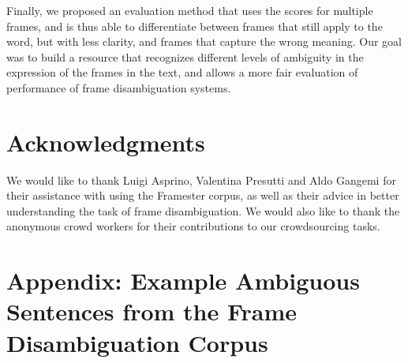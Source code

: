 Finally, we proposed an evaluation method that uses the scores for multiple frames, and is thus able to differentiate between frames that still apply to the word, but with less clarity, and frames that capture the wrong meaning. Our goal was to build a resource that recognizes different levels of ambiguity in the expression of the frames in the text, and allows a more fair evaluation of performance of frame disambiguation systems.

\section*{Acknowledgments}

We would like to thank Luigi Asprino, Valentina Presutti and Aldo Gangemi for their assistance with using the Framester corpus, as well as their advice in better understanding the task of frame disambiguation. We would also like to thank the anonymous crowd workers for their contributions to our crowdsourcing tasks.

\section*{Appendix: Example Ambiguous Sentences from the Frame Disambiguation Corpus}

